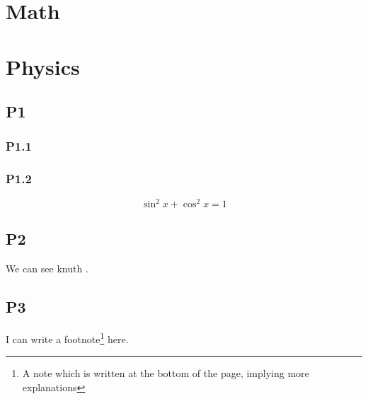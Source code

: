 \chapter{Math}
\chapter{Physics}
\section{P1}
\subsection{P1.1}
\subsection{P1.2}
\[
\sin ^2 x + \cos ^2 x = 1
\]

\section{P2}
We can see knuth \cite{knuth:1984}.
\section{P3}
I can write a footnote\footnote{A note which is written at the bottom of the page, implying more explanations}
here.